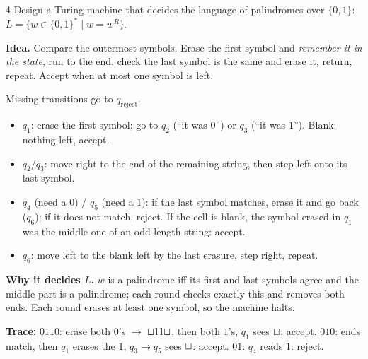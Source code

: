 \begin{question}{4}
Design a Turing machine that decides the language of palindromes over $\{0,1\}$:
$L=\{w\in\{0,1\}^*\mid w=w^R\}$.
\end{question}
\begin{soln}
\textbf{Idea.} Compare the outermost symbols. Erase the first symbol and \emph{remember it in the state}, run to the end, check the last symbol is the same and erase it, return, repeat. Accept when at most one symbol is left.

\begin{center}

{\footnotesize Missing transitions go to $q_{\mathrm{reject}}$.}
\end{center}

\begin{itemize}
\item $q_1$: erase the first symbol; go to $q_2$ (``it was $0$'') or $q_3$ (``it was $1$''). Blank: nothing left, accept.
\item $q_2/q_3$: move right to the end of the remaining string, then step left onto its last symbol.
\item $q_4$ (need a $0$) / $q_5$ (need a $1$): if the last symbol matches, erase it and go back ($q_6$); if it does not match, reject. If the cell is blank, the symbol erased in $q_1$ was the middle one of an odd-length string: accept.
\item $q_6$: move left to the blank left by the last erasure, step right, repeat.
\end{itemize}

\textbf{Why it decides $L$.} $w$ is a palindrome iff its first and last symbols agree and the middle part is a palindrome; each round checks exactly this and removes both ends. Each round erases at least one symbol, so the machine halts.

\textbf{Trace:} $0110$: erase both $0$'s $\to$ $\sqcup11\sqcup$, then both $1$'s, $q_1$ sees $\sqcup$: accept. $010$: ends match, then $q_1$ erases the $1$, $q_3\to q_5$ sees $\sqcup$: accept. $01$: $q_4$ reads $1$: reject.
\end{soln}

